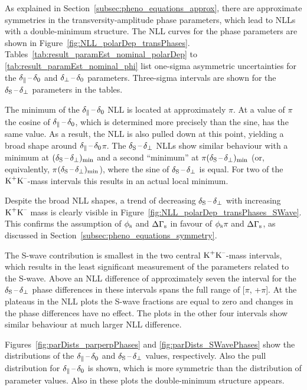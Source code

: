 As explained in Section~\ref{subsec:pheno_equations_approx}, there are approximate symmetries in the transversity-amplitude phase
parameters, which lead to NLLs with a double-minimum structure. The NLL curves for the phase parameters are shown in
Figure~\ref{fig:NLL_polarDep_transPhases}. Tables~\ref{tab:result_paramEst_nominal_polarDep} to \ref{tab:result_paramEst_nominal_phi} list
one-sigma asymmetric uncertainties for the $\delta_{\parallel}\,\text{--}\,\delta_{0}$ and $\delta_{\perp}\,\text{--}\,\delta_{0}$ parameters. Three-sigma intervals are shown for the $\delta_{\text{S}}\,\text{--}\,\delta_{\perp}$
parameters in the tables.

The minimum of the $\delta_{\parallel}\,\text{--}\,\delta_{0}$ NLL is located at approximately $\pi$. At a value of $\pi$ the cosine of
$\delta_{\parallel}\,\text{--}\,\delta_{0}$, which is determined more precisely than the sine, has the same value. As a result, the NLL is also pulled down at this
point, yielding a broad shape around $\delta_{\parallel}\,\text{--}\,\delta_{0}$\texteq$\pi$. The $\delta_{\text{S}}\,\text{--}\,\delta_{\perp}$ NLLs show similar behaviour with a minimum at
$(\delta_{\text{S}}\,\text{--}\,\delta_{\perp})_\text{min}$ and a second ``minimum'' at $\pi$\textminus$(\delta_{\text{S}}\,\text{--}\,\delta_{\perp})_\text{min}$ (or, equivalently,
\tm$\pi$\textminus$(\delta_{\text{S}}\,\text{--}\,\delta_{\perp})_\text{min}$), where the sine of $\delta_{\text{S}}\,\text{--}\,\delta_{\perp}$ is equal. For two of the $\text{K}^\text{+}\text{K}^\text{--}$-mass intervals this results in an
actual local minimum.

Despite the broad NLL shapes, a trend of decreasing $\delta_{\text{S}}\,\text{--}\,\delta_{\perp}$ with increasing $\text{K}^\text{+}\text{K}^\text{--}$ mass is clearly visible in
Figure~\ref{fig:NLL_polarDep_transPhases_SWave}. This confirms the assumption of $\phi_\text{s}$ and $\Delta\Gamma_\text{s}$ in favour of
$\phi_\text{s}$\textapprox$\pi$ and $\Delta\Gamma_\text{s}$, as discussed in Section~\ref{subsec:pheno_equations_symmetry}.

The S-wave contribution is smallest in the two central $\text{K}^\text{+}\text{K}^\text{--}$-mass intervals, which results in the least significant measurement of the
parameters related to the S-wave. Above an NLL difference of approximately seven the interval for the $\delta_{\text{S}}\,\text{--}\,\delta_{\perp}$ phase differences in
these intervals spans the full range of [\tm$\pi$, +$\pi$]. At the plateaus in the NLL plots the S-wave fractions are equal to zero and
changes in the phase differences have no effect. The plots in the other four intervals show similar behaviour at much larger NLL
difference.

Figures~\ref{fig:parDists_parperpPhases} and \ref{fig:parDists_SWavePhases} show the distributions of the $\delta_{\parallel}\,\text{--}\,\delta_{0}$ and $\delta_{\text{S}}\,\text{--}\,\delta_{\perp}$
values, respectively. Also the pull distribution for $\delta_{\parallel}\,\text{--}\,\delta_{0}$ is shown, which is more symmetric than the distribution of parameter
values. Also in these plots the double-minimum structure appears.
